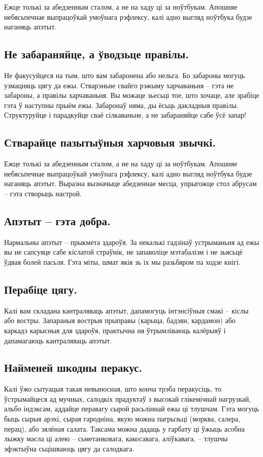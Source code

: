 Ежце толькі за абедзенным сталом, а не на хаду ці за ноўтбукам. Апошняе небясьпечнае выпрацоўкай умоўнага рэфлексу, калі адно выгляд ноўтбука будзе наганяць апэтыт.

\subsection{Не забараняйце, а ўводзьце правілы.}
Не факусуйцеся на тым, што вам забаронена або нельга. Бо забароны могуць узмацняць цягу да ежы. Стварэньне свайго рэжыму харчаваньня – гэта не забароны, а правілы харчаваньня. Вы можаце зьесьці тое, што хочаце, але зрабіце гэта ў наступны прыём ежы. Забаронаў няма, ды ёсьць дакладныя правілы. Структуруйце і парадкуйце сваё сілкаваньне, а не забараняйце сабе ўсё запар!

\subsection{Стварайце пазытыўныя харчовыя звычкі.}
Ежце толькі за абедзенным сталом, а не на хаду ці за ноўтбукам. Апошняе небясьпечнае выпрацоўкай умоўнага рэфлексу, калі адно выгляд ноўтбука будзе наганяць апэтыт. Выразна вызначыце абедзеннае месца, упрыгожце стол абрусам – гэта створыць настрой.

\subsection{Апэтыт – гэта добра.}
Нармальны апэтыт – прыкмета здароўя. За некалькі гадзінаў устрыманьня ад ежы вы не сапсуяце сабе кіслатой страўнік, не запаволіце мэтабалізм і не зьясьцё ўдвая болей пасьля. Гэта міты, шмат якія зь іх мы разьбяром па ходзе кнігі.

\subsection{Перабіце цягу.}
Калі вам складана кантраляваць апэтыт, дапамогуць інтэнсіўныя смакі – кіслы або востры. Запараныя вострыя прыправы (карыца, бадзян, кардамон) або каркадэ карысныя для здароўя, практычна ня ўтрымліваюць калёрыяў і дапамагаюць кантраляваць апэтыт.

\subsection{Найменей шкодны перакус.}
Калі ўжо сытуацыя такая невыносная, што конча трэба перакусіць, то ўстрымайцеся ад мучных, салодкіх прадуктаў з высокай глікемічнай нагрузкай, альбо індэксам, аддайце перавагу сырой расьліннай ежы ці тлушчам. Гэта могуць быць сырыя арэхі, сырая гародніна, якую можна пагрызьці (морква, салера, перац), або зялёная салата. Таксама можна дадаць у гарбату ці ўжыць асобна лыжку масла ці алею – сьметанковага, какосавага, аліўкавага, – тлушчы эфэктыўна сьцішваюць цягу да салодкага.

